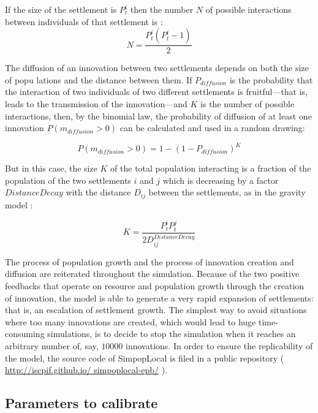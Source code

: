 If the size of the settlement is $P^{i}_{t}$ then the number $N$ of possible interactions between individuals of that settlement is :
 \begin{equation}
N = \frac{P^{i}_{t} \left(P^{i}_{t}  - 1 \right)}{2}
\end{equation}

The diffusion of an innovation between two settlements depends on both the size of popu­ lations and the distance between them. If $P_{diffusion}$ is the probability that the interaction of two individuals of two different settlements is fruitful—that is, leads to the transmission of the innovation—and $K$ is the number of possible interactions, then, by the binomial law, the probability of diffusion of at least one innovation $P ( m_{diffusion} > 0)$ can be calculated and used in a random drawing:

\begin{equation}
P (m_{diffusion} > 0 ) = 1 - ( 1 - P_{diffusion})^{K}
\end{equation}

But in this case, the size $K$ of the total population interacting is a fraction of the population of the two settlements $i$ and $j$ which is decreasing by a factor $DistanceDecay$ with the distance $D_{ij}$ between the settlements, as in the gravity model \autocite{Wilson1971}:

\begin{equation}
K = \frac{P^{i}_{t} P^{j}_{t}}{ 2 D^{DistanceDecay}_{ij}}
\end{equation}

The process of population growth and the process of innovation creation and diffusion are reiterated throughout the simulation. Because of the two positive feedbacks that operate on resource and population growth through the creation of innovation, the model is able to generate a very rapid expansion of settlements: that is, an escalation of settlement growth. The simplest way to avoid situations where too many innovations are created, which would lead to huge time-consuming simulations, is to decide to stop the simulation when it reaches an arbitrary number of, say, $\num{10000}$ innovations. In order to ensure the replicability of the model, the source code of SimpopLocal is filed in a public repository ( \href{http://iscpif.github.io/ simpoplocal-epb/}{http://iscpif.github.io/ simpoplocal-epb/} ).


\subsection{Parameters to calibrate}
\label{subsec:parameters}

